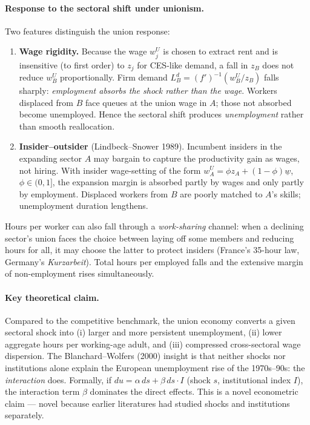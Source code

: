 \documentclass[11pt,a4paper]{article}
\begin{document}
\paragraph{Response to the sectoral shift under unionism.}
Two features distinguish the union response:
\begin{enumerate}[leftmargin=*,itemsep=2pt]
    \item \textbf{Wage rigidity.} Because the wage $w_j^{U}$ is chosen to extract rent and is insensitive (to first order) to $z_j$ for CES-like demand, a fall in $z_B$ does not reduce $w_B^{U}$ proportionally. Firm demand $L_B^{d}=(f')^{-1}(w_B^{U}/z_B)$ falls sharply: \emph{employment absorbs the shock rather than the wage}. Workers displaced from $B$ face queues at the union wage in $A$; those not absorbed become unemployed. Hence the sectoral shift produces \emph{unemployment} rather than smooth reallocation.
    \item \textbf{Insider--outsider} (Lindbeck--Snower 1989). Incumbent insiders in the expanding sector $A$ may bargain to capture the productivity gain as wages, not hiring. With insider wage-setting of the form $w_A^{U}=\phi z_A +(1-\phi)\underline w$, $\phi\in(0,1]$, the expansion margin is absorbed partly by wages and only partly by employment. Displaced workers from $B$ are poorly matched to $A$'s skills; unemployment duration lengthens.
\end{enumerate}
Hours per worker can also fall through a \emph{work-sharing} channel: when a declining sector's union faces the choice between laying off some members and reducing hours for all, it may choose the latter to protect insiders (France's 35-hour law, Germany's \emph{Kurzarbeit}). Total hours per employed falls and the extensive margin of non-employment rises simultaneously.

\paragraph{Key theoretical claim.}
Compared to the competitive benchmark, the union economy converts a given sectoral shock into (i) larger and more persistent unemployment, (ii) lower aggregate hours per working-age adult, and (iii) compressed cross-sectoral wage dispersion. The Blanchard--Wolfers (2000) insight is that neither shocks nor institutions alone explain the European unemployment rise of the 1970s--90s: the \emph{interaction} does. Formally, if $du=\alpha\,ds+\beta\,ds\cdot I$ (shock $s$, institutional index $I$), the interaction term $\beta$ dominates the direct effects. This is a novel econometric claim --- novel because earlier literatures had studied shocks and institutions separately.
\end{document}
